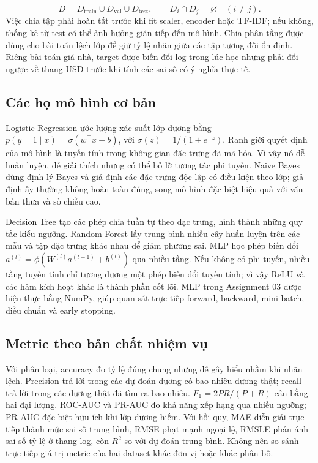 \documentclass[12pt,a4paper]{report}
\begin{document}
\begin{equation}D=D_{\mathrm{train}}\cup D_{\mathrm{val}}\cup D_{\mathrm{test}},\qquad D_i\cap D_j=\varnothing\quad(i\ne j).\end{equation}
Việc chia tập phải hoàn tất trước khi fit scaler, encoder hoặc TF-IDF; nếu không, thống kê từ test có thể ảnh hưởng gián tiếp đến mô hình. Chia phân tầng được dùng cho bài toán lệch lớp để giữ tỷ lệ nhãn giữa các tập tương đối ổn định. Riêng bài toán giá nhà, target được biến đổi log trong lúc học nhưng phải đổi ngược về thang USD trước khi tính các sai số có ý nghĩa thực tế.

\subsection{Các họ mô hình cơ bản}
Logistic Regression ước lượng xác suất lớp dương bằng $p(y=1\mid x)=\sigma(w^\top x+b)$, với $\sigma(z)=1/(1+e^{-z})$. Ranh giới quyết định của mô hình là tuyến tính trong không gian đặc trưng đã mã hóa. Vì vậy nó dễ huấn luyện, dễ giải thích nhưng có thể bỏ lỡ tương tác phi tuyến. Naive Bayes dùng định lý Bayes và giả định các đặc trưng độc lập có điều kiện theo lớp; giả định ấy thường không hoàn toàn đúng, song mô hình đặc biệt hiệu quả với văn bản thưa và số chiều cao.

Decision Tree tạo các phép chia tuần tự theo đặc trưng, hình thành những quy tắc kiểu ngưỡng. Random Forest lấy trung bình nhiều cây huấn luyện trên các mẫu và tập đặc trưng khác nhau để giảm phương sai. MLP học phép biến đổi $a^{(l)}=\phi(W^{(l)}a^{(l-1)}+b^{(l)})$ qua nhiều tầng. Nếu không có phi tuyến, nhiều tầng tuyến tính chỉ tương đương một phép biến đổi tuyến tính; vì vậy ReLU và các hàm kích hoạt khác là thành phần cốt lõi. MLP trong Assignment 03 được hiện thực bằng NumPy, giúp quan sát trực tiếp forward, backward, mini-batch, điều chuẩn và early stopping.

\subsection{Metric theo bản chất nhiệm vụ}
Với phân loại, accuracy đo tỷ lệ đúng chung nhưng dễ gây hiểu nhầm khi nhãn lệch. Precision trả lời trong các dự đoán dương có bao nhiêu dương thật; recall trả lời trong các dương thật đã tìm ra bao nhiêu. $F_1=2PR/(P+R)$ cân bằng hai đại lượng. ROC-AUC và PR-AUC đo khả năng xếp hạng qua nhiều ngưỡng; PR-AUC đặc biệt hữu ích khi lớp dương hiếm. Với hồi quy, MAE diễn giải trực tiếp thành mức sai số trung bình, RMSE phạt mạnh ngoại lệ, RMSLE phản ánh sai số tỷ lệ ở thang log, còn $R^2$ so với dự đoán trung bình. Không nên so sánh trực tiếp giá trị metric của hai dataset khác đơn vị hoặc khác phân bố.
\end{document}
